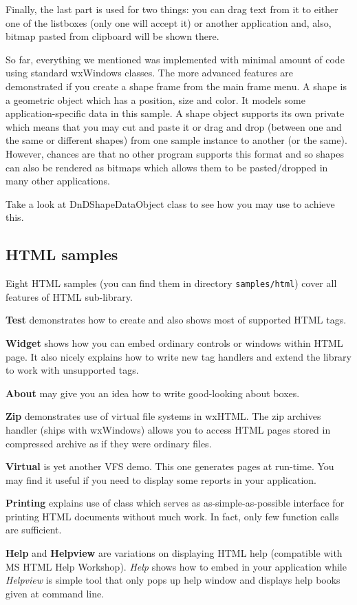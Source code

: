 Finally, the last part is used for two things: you can drag text from it to
either one of the listboxes (only one will accept it) or another application
and, also, bitmap pasted from clipboard will be shown there.

So far, everything we mentioned was implemented with minimal amount of code
using standard wxWindows classes. The more advanced features are demonstrated
if you create a shape frame from the main frame menu. A shape is a geometric
object which has a position, size and color. It models some
application-specific data in this sample. A shape object supports its own
private  which means that you may cut and
paste it or drag and drop (between one and the same or different shapes) from
one sample instance to another (or the same). However, chances are that no
other program supports this format and so shapes can also be rendered as
bitmaps which allows them to be pasted/dropped in many other applications.

Take a look at DnDShapeDataObject class to see how you may use 
 to achieve this.


\subsection{HTML samples}\label{samplehtml}

Eight HTML samples (you can find them in directory {\tt samples/html})
cover all features of HTML sub-library.

{\bf Test} demonstrates how to create 
and also shows most of supported HTML tags.

{\bf Widget} shows how you can embed ordinary controls or windows within
HTML page. It also nicely explains how to write new tag handlers and extend
the library to work with unsupported tags.

{\bf About} may give you an idea how to write good-looking about boxes.

{\bf Zip} demonstrates use of virtual file systems in wxHTML. The zip archives
handler (ships with wxWindows) allows you to access HTML pages stored 
in compressed archive as if they were ordinary files.

{\bf Virtual} is yet another VFS demo. This one generates pages at run-time.
You may find it useful if you need to display some reports in your application.

{\bf Printing} explains use of 
class which serves as as-simple-as-possible interface for printing HTML 
documents without much work. In fact, only few function calls are sufficient.

{\bf Help} and {\bf Helpview} are variations on displaying HTML help 
(compatible with MS HTML Help Workshop). {\it Help} shows how to embed
 in your application
while {\it Helpview} is simple tool that only pops up help window and
displays help books given at command line.

